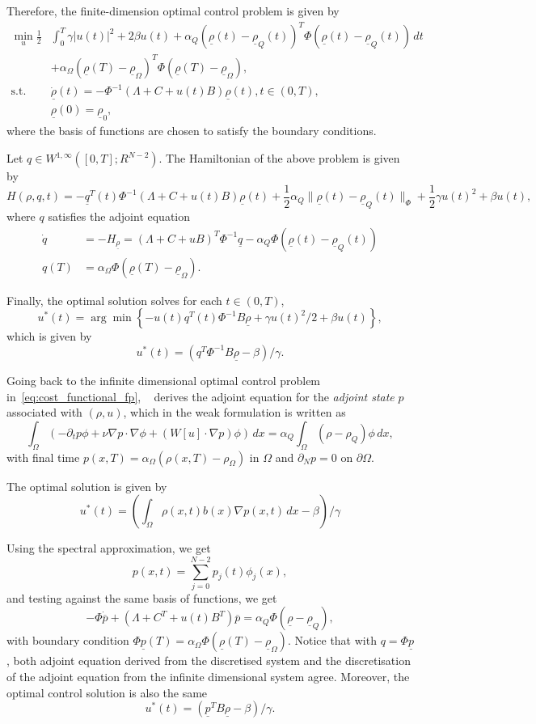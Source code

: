 \documentclass[12pt]{article}
\newcommand{\rhovec}{\underline{\rho}}
\theoremstyle{definition}
\begin{document}
Therefore, the finite-dimension optimal control problem is given by
\begin{align}
    \label{eq:finite-control-problem}
    \min_u \frac{1}{2} &\int_0^T \gamma|u(t)|^2 + 2\beta u(t) + \alpha_Q {(\rhovec(t) - \rhovec_Q(t))}^T  \Phi {(\rhovec(t) - \rhovec_Q(t))} \, dt \\ 
    &+ \alpha_{\Omega} {(\rhovec(T) - \rhovec_{\Omega})}^T  \Phi {(\rhovec(T) - \rhovec_{\Omega})}, \\
    \text{s.t. } &\dot{\rhovec}(t) = -\Phi^{-1}(\Lambda + C + u(t) B) \rhovec(t), t \in (0,T), \\
    &\rhovec(0) = \rhovec_0,
\end{align}
where the basis of functions are chosen to satisfy the boundary conditions.

Let $q \in W^{1,\infty}([0,T]; R^{N-2})$. 
The Hamiltonian of the above problem is given by
\[
H(\rho,q,t) = -\underline{q}^T(t) \Phi^{-1} (\Lambda + C + u(t)B) \rhovec(t) + \frac{1}{2}\alpha_Q  \|\rhovec(t) - \rhovec_Q(t)\|_{\Phi} + \frac{1}{2}\gamma {u(t)}^2 + \beta u(t),
\]
where $q$ satisfies the adjoint equation
\begin{align*}
    \dot{q} &= - H_{\rhovec} = {(\Lambda + C + uB)}^T\Phi^{-1} \underline{q} - \alpha_Q \Phi {(\rhovec(t) - \rhovec_Q(t))} \\
    q(T) &= \alpha_{\Omega} \Phi(\rhovec(T) - \rhovec_{\Omega}).
\end{align*}

Finally, the optimal solution solves for each $t \in (0,T)$,
\[
u^*(t) = \arg \min \left\{-u(t)q^T(t)\Phi^{-1}B \rhovec + \gamma {u(t)}^2/2 + \beta u(t) \right\},
\]
which is given by
\[
u^*(t) = (q^T\Phi^{-1} B \rhovec - \beta)/\gamma.    
\]

Going back to the infinite dimensional optimal control problem in~\eqref{eq:cost_functional_fp}, 
~\cite{aronna2021first} derives the adjoint equation for the {\em adjoint state\/} $p$ associated with $(\rho, u)$, which in the weak formulation is written as
\[
\int_{\Omega} \left(-\partial_t p \phi + \nu \nabla p \cdot \nabla \phi + (W[u]\cdot\nabla p) \phi\right) \, dx = \alpha_Q \int_{\Omega} (\rho - \rho_Q) \phi \, dx,
\]
with final time $p(x,T) = \alpha_{\Omega}(\rho(x,T) - \rho_{\Omega})$ in $\Omega$ and $\partial_N p = 0$ on $\partial \Omega$.

The optimal solution is given by 
\[
u^*(t) = \left(\int_{\Omega} \rho(x,t) b(x) \nabla p(x,t) \, dx  - \beta \right)/\gamma
\]

Using the spectral approximation, we get 
\[
p(x,t) = \sum_{j=0}^{N-2} p_j(t) \phi_j(x),
\]
and testing against the same basis of functions, we get 
\[
-\Phi \dot{\overline{p}} + (\Lambda + C^T + u(t) B^T)\overline{p} = \alpha_Q \Phi (\rhovec - \rhovec_Q),
\]
with boundary condition $\Phi \underline{p}(T) = \alpha_{\Omega}\Phi(\rhovec(T) - \rhovec_{\Omega})$.
Notice that with $q = \Phi \underline{p}$, both adjoint equation derived from the discretised system and the discretisation of the adjoint equation from the infinite dimensional system agree.
Moreover, the optimal control solution is also the same
\[
u^*(t) = (\underline{p}^T B\rhovec - \beta)/\gamma.    
\]
\end{document}
